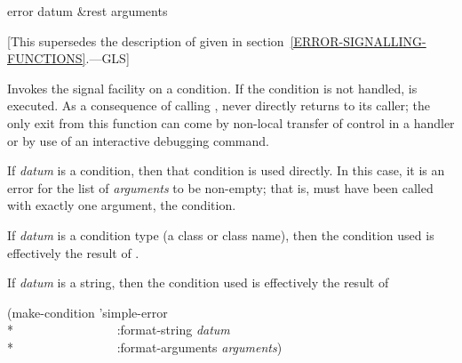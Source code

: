 \begin{defun}[Function]
error datum &rest arguments

   [This supersedes the description of 
   given in section~\ref{ERROR-SIGNALLING-FUNCTIONS}.---GLS]

  Invokes the signal facility on a condition. If the condition is not handled,
   is executed. As a consequence of calling 
  ,  never directly returns to its caller; the only exit from this
  function can come by non-local transfer of control in a handler or by use of
  an interactive debugging command.

  If \emph{datum} is a condition, then that condition is used directly. 
  In this case, it is an error for the list of \emph{arguments} to be non-empty;
  that is,  must have been called with exactly one argument, the condition.

  If \emph{datum} is a condition type (a class or class name), then the condition used is effectively the result
  of .

  If \emph{datum} is a string, then the condition used is effectively the result of
\begin{lisp}
(make-condition 'simple-error \\*
~~~~~~~~~~~~~~~~:format-string \emph{datum} \\*
~~~~~~~~~~~~~~~~:format-arguments \emph{arguments})
\end{lisp}
\end{defun}


